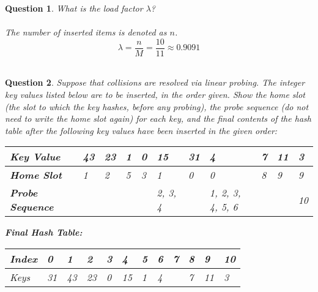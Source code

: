 \documentclass[10.5pt]{article}
\newtheorem{Q}{Question}
\begin{document}
\begin{Q}
What is the load factor $\lambda$?\\
\\
\textup{The number of inserted items is denoted as }$n$\textup{.}
$$
\lambda = \frac{n}{M} = \frac{10}{11} \approx 0.9091
$$
\\
\end{Q}

\begin{Q}
Suppose that collisions are resolved via linear probing. The integer key values listed below are to
be inserted, in the order given. Show the home slot (the slot to which the key hashes, before any probing), the
probe sequence (do not need to write the home slot again) for each key, and the final contents of the hash table after the following key values have been inserted in the given order:
\begin{table}[ht]
\begin{tabular}{|p{1.7cm}|p{1cm}|p{1cm}|p{1cm}|p{1cm}|p{1cm}|p{1cm}|p{1cm}|p{1cm}|p{1cm}|p{1cm}|}
\hline
\textbf{Key Value}     &43&23&1&0&15     &31&4              &7&11&3 \\ \hline
\textbf{Home Slot}     &1 &2 &5&3&1      &0 &0              &8&9 &9     \\ \hline
\textbf{Probe Sequence}&  &  & & &2, 3, 4&  &1, 2, 3, 4, 5, 6& &  &10     \\ \hline
\end{tabular}
\end{table}
\pagebreak

\textbf{Final Hash Table:}
\begin{table}[ht]
\begin{tabular}{|l|p{1cm}|p{1cm}|p{1cm}|p{1cm}|p{1cm}|p{1cm}|p{1cm}|p{1cm}|p{1cm}|p{1cm}|p{1cm}|}
\hline
Index & 0&1 &2 &3&4 &5&6&7&8&9 &10 \\ \hline
Keys  &31&43&23&0&15&1&4& &7&11&3\\ \hline
\end{tabular}
\end{table}
\end{Q}
\end{document}
